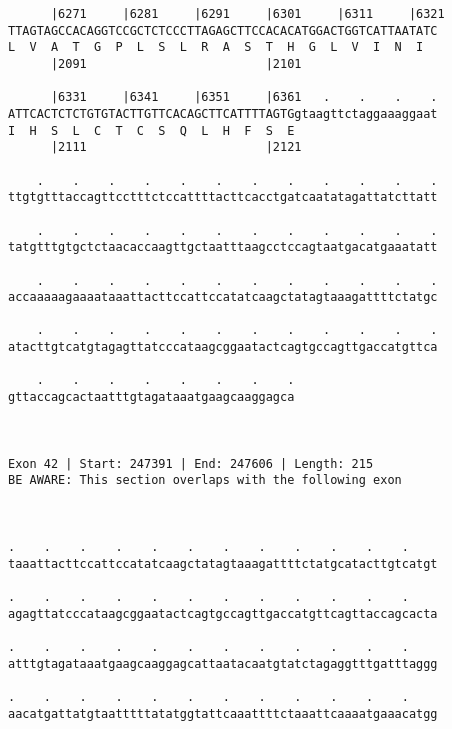 \documentclass{article}
\begin{document}
\begin{Verbatim}
      |6271     |6281     |6291     |6301     |6311     |6321
TTAGTAGCCACAGGTCCGCTCTCCCTTAGAGCTTCCACACATGGACTGGTCATTAATATC
L  V  A  T  G  P  L  S  L  R  A  S  T  H  G  L  V  I  N  I  
      |2091                         |2101                   
  
      |6331     |6341     |6351     |6361   .    .    .    .
ATTCACTCTCTGTGTACTTGTTCACAGCTTCATTTTAGTGgtaagttctaggaaaggaat
I  H  S  L  C  T  C  S  Q  L  H  F  S  E                    
      |2111                         |2121                   
  
    .    .    .    .    .    .    .    .    .    .    .    .
ttgtgtttaccagttcctttctccattttacttcacctgatcaatatagattatcttatt
                                                            
    .    .    .    .    .    .    .    .    .    .    .    .
tatgtttgtgctctaacaccaagttgctaatttaagcctccagtaatgacatgaaatatt
                                                            
    .    .    .    .    .    .    .    .    .    .    .    .
accaaaaagaaaataaattacttccattccatatcaagctatagtaaagattttctatgc
                                                            
    .    .    .    .    .    .    .    .    .    .    .    .
atacttgtcatgtagagttatcccataagcggaatactcagtgccagttgaccatgttca
                                                            
    .    .    .    .    .    .    .    .
gttaccagcactaatttgtagataaatgaagcaaggagca
                                        
                                        
 
Exon 42 | Start: 247391 | End: 247606 | Length: 215
BE AWARE: This section overlaps with the following exon



.    .    .    .    .    .    .    .    .    .    .    .    
taaattacttccattccatatcaagctatagtaaagattttctatgcatacttgtcatgt
                                                            
.    .    .    .    .    .    .    .    .    .    .    .    
agagttatcccataagcggaatactcagtgccagttgaccatgttcagttaccagcacta
                                                            
.    .    .    .    .    .    .    .    .    .    .    .    
atttgtagataaatgaagcaaggagcattaatacaatgtatctagaggtttgatttaggg
                                                            
.    .    .    .    .    .    .    .    .    .    .    .    
aacatgattatgtaatttttatatggtattcaaattttctaaattcaaaatgaaacatgg
                                                            

\end{Verbatim}
\end{document}
